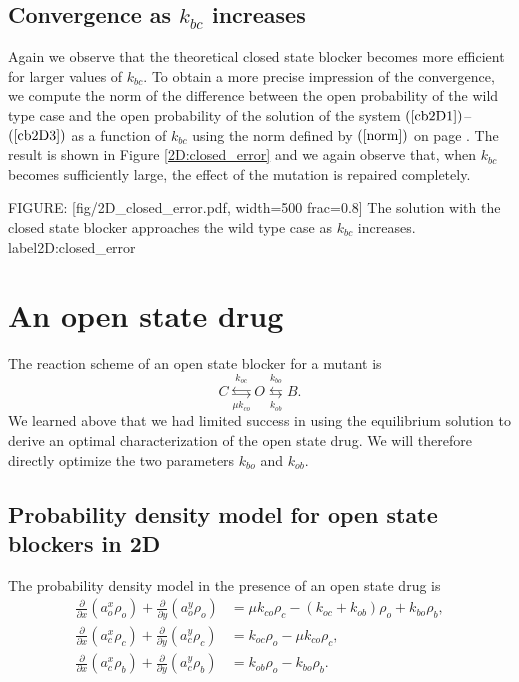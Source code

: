 {\subsection{Convergence as $k_{bc}$ increases}
 Again we observe that the theoretical closed state blocker becomes more
efficient for larger values of $k_{bc}.$ To obtain a more precise impression of the convergence,
 we compute the norm of the difference between the open probability
of the wild type case and the open probability of the solution of the system
$(\ref{cb2D1})$--$(\ref{cb2D3})$ as a function of $k_{bc}$ using the norm defined by $(\ref{norm})$ on page \pageref{norm}. 
The result is shown in Figure \ref{2D:closed_error} and we again observe that, when $k_{bc}$ becomes sufficiently large, the effect of the mutation is repaired completely.

FIGURE: [fig/2D_closed_error.pdf, width=500 frac=0.8] The solution with the closed state blocker approaches the wild type case as $k_{bc}$ increases. label{2D:closed_error}\section{An open state drug}

The reaction scheme of an open state blocker for a mutant is
\[
C\underset{\mu k_{co}}{\overset{k_{oc}}{\leftrightarrows}}O\underset{k_{ob}
}{\overset{k_{bo}}{\leftrightarrows}}B.
\]
We learned above that we had limited success in using the equilibrium solution
to derive an optimal characterization of the open state drug. We will
therefore directly optimize the two parameters $k_{bo}$ and $k_{ob}.$

\subsection{Probability density model for open state blockers in 2D}

The probability density model in the presence of an open state drug is
\begin{align}
\frac{\partial}{\partial x}\left(  a_{o}^{x}\rho_{o}\right)  +\frac{\partial
}{\partial y}\left(  a_{o}^{y}\rho_{o}\right)   &  =\mu k_{co}\rho_{c}
-(k_{oc}+k_{ob})\rho_{o} + k_{bo}\rho_{b},\label{ob2D1}\\
\frac{\partial}{\partial x}\left(  a_{c}^{x}\rho_{c}\right)  +\frac{\partial
}{\partial y}\left(  a_{c}^{y}\rho_{c}\right)   &  =k_{oc}\rho_{o}-\mu
k_{co}\rho_{c},\label{ob2D2}\\
\frac{\partial}{\partial x}\left(  a_{c}^{x}\rho_{b}\right)  +\frac{\partial
}{\partial y}\left(  a_{c}^{y}\rho_{b}\right)   &  =k_{ob}\rho_{o}-k_{bo}
\rho_{b}.\label{ob2D3}
\end{align}

}
